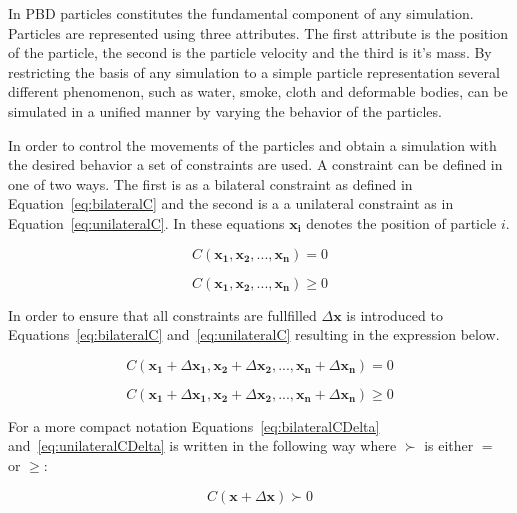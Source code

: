In PBD particles constitutes the fundamental component of
any simulation.  Particles are represented using three attributes. The first
attribute is the position of the particle, the second is the particle velocity
and the third is it's mass. By restricting the basis of any simulation to a
simple particle representation several different phenomenon, such as water,
smoke, cloth and deformable bodies, can be simulated in a unified manner by
varying the behavior of the particles.

In order to control the movements of the particles and obtain a simulation with
the desired behavior a set of constraints are used. A constraint can be defined
in one of two ways. The first is as a bilateral constraint as defined in
Equation~\ref{eq:bilateralC} and the second is a a unilateral constraint as in
Equation~\ref{eq:unilateralC}. In these equations $ \mathbf{x_{i}} $ denotes
the position of particle $ i $.

\begin{equation}
\label{eq:bilateralC}
C(\mathbf{x_{1}}, \mathbf{x_{2}}, ..., \mathbf{x_{n}}) = 0
\end{equation}

\begin{equation}
\label{eq:unilateralC}
C(\mathbf{x_{1}}, \mathbf{x_{2}}, ..., \mathbf{x_{n}}) \geq 0
\end{equation}

In order to ensure that all constraints are fullfilled $ \Delta \mathbf{x} $ is
introduced to Equations~\ref{eq:bilateralC} and~\ref{eq:unilateralC} resulting
in the expression below.

\begin{equation}
\label{eq:bilateralCDelta}
C(\mathbf{x_{1}} + \Delta \mathbf{x_{1}}, \mathbf{x_{2}} + \Delta \mathbf{x_{2}}, ..., \mathbf{x_{n}} + \Delta \mathbf{x_{n}}) = 0
\end{equation}

\begin{equation}
\label{eq:unilateralCDelta}
C(\mathbf{x_{1}} + \Delta \mathbf{x_{1}}, \mathbf{x_{2}} + \Delta \mathbf{x_{2}}, ..., \mathbf{x_{n}} + \Delta \mathbf{x_{n}}) \geq 0
\end{equation}

For a more compact notation Equations~\ref{eq:bilateralCDelta}
and~\ref{eq:unilateralCDelta} is written in the following way
where $ \succ $ is either $ = $ or $ \geq $:

\begin{equation}
\label{eq:cCombined}
C(\mathbf{x} + \Delta \mathbf{x}) \succ 0
\end{equation}

